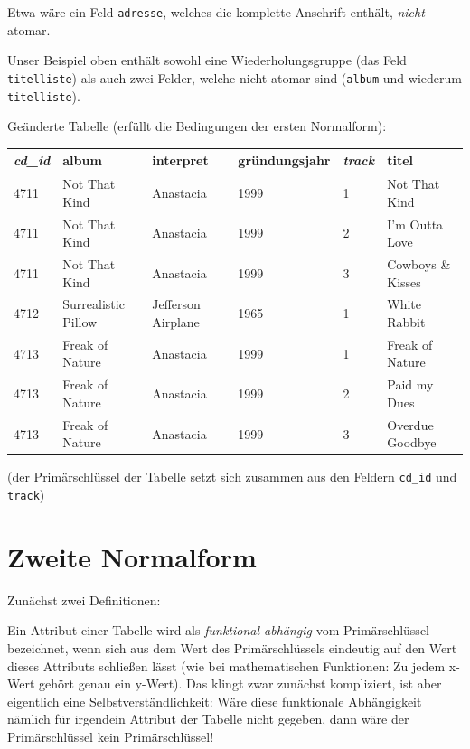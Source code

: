 Etwa wäre ein Feld \lstinline|adresse|, welches die komplette Anschrift 
enthält, \emph{nicht} atomar.

Unser Beispiel oben enthält sowohl eine Wiederholungsgruppe (das Feld
\lstinline|titelliste|) als auch zwei Felder, welche nicht atomar sind
(\lstinline|album| und wiederum \lstinline|titelliste|).

\begin{minipage}{1.0\textwidth}
Geänderte Tabelle (erfüllt die Bedingungen der ersten Normalform):

\begin{center}
\begin{tabular}{|l|l|l|l|l|l|}\hline
\textbf{\em cd\_id} & \textbf{album} & \textbf{interpret} &
\textbf{gründungsjahr} & \textbf{\em track} & \textbf{titel}\\ \hline
4711 & Not That Kind & Anastacia & 1999 & 1 & Not That Kind\\ \hline
4711 & Not That Kind & Anastacia & 1999 & 2 & I'm Outta Love\\ \hline
4711 & Not That Kind & Anastacia & 1999 & 3 & Cowboys \& Kisses\\ \hline
4712 & Surrealistic Pillow & Jefferson Airplane & 1965 & 1 & White Rabbit\\
\hline
4713 & Freak of Nature & Anastacia & 1999 & 1 & Freak of Nature\\ \hline
4713 & Freak of Nature & Anastacia & 1999 & 2 & Paid my Dues\\ \hline
4713 & Freak of Nature & Anastacia & 1999 & 3 & Overdue Goodbye\\ \hline
\end{tabular}
\end{center}
\end{minipage}

(der Primärschlüssel der Tabelle setzt sich zusammen aus den Feldern
\lstinline|cd_id| und \lstinline|track|)


\section{Zweite Normalform}

Zunächst zwei Definitionen:

Ein Attribut einer Tabelle wird als \emph{funktional abhängig} vom 
Primärschlüssel bezeichnet, wenn sich aus dem Wert des Primärschlüssels 
eindeutig auf den Wert dieses Attributs schließen lässt (wie bei mathematischen 
Funktionen: Zu jedem x-Wert gehört genau ein y-Wert). Das klingt zwar zunächst 
kompliziert, ist aber eigentlich eine Selbstverständlichkeit: Wäre diese 
funktionale Abhängigkeit nämlich für irgendein Attribut der Tabelle nicht 
gegeben, dann wäre der Primärschlüssel kein Primärschlüssel!

